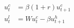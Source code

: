   \begin{align}
    u^c_t &= \beta(1+r)u^c_{t+1} \label{eq:euler_cons} \\
    u_t^l &= W u^c_t - \beta u^h_{t+1} \label{eq:euler_leisure}
  \end{align}
